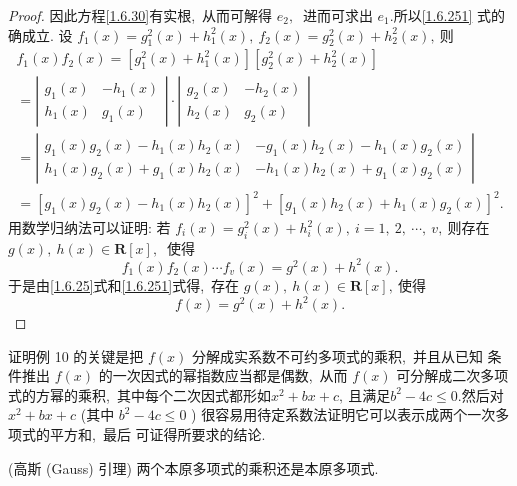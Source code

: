 \begin{proof}
	因此方程\eqref{1.6.30}有实根,\  从而可解得 $ e_{2} ,\ $ 进而可求出  $e_{1}  .$所以\eqref{1.6.251} 式的确成立.
	设 $ f_{1}(x)=g_{1}^{2}(x)+h_{1}^{2}(x),\  f_{2}(x)=g_{2}^{2}(x)+h_{2}^{2}(x) ,\  $则
	$$\begin{array}{l}
		f_{1}(x) f_{2}(x)=\left[g_{1}^{2}(x)+h_{1}^{2}(x)\right]\left[g_{2}^{2}(x)+h_{2}^{2}(x)\right] \\
		=\left|\begin{array}{cc}
			g_{1}(x) & -h_{1}(x) \\
			h_{1}(x) & g_{1}(x)
		\end{array}\right| \cdot\left|\begin{array}{cc}
			g_{2}(x) & -h_{2}(x) \\
			h_{2}(x) & g_{2}(x)
		\end{array}\right| \\
		=\left|\begin{array}{ll}
			g_{1}(x) g_{2}(x)-h_{1}(x) h_{2}(x) & -g_{1}(x) h_{2}(x)-h_{1}(x) g_{2}(x) \\
			h_{1}(x) g_{2}(x)+g_{1}(x) h_{2}(x) & -h_{1}(x) h_{2}(x)+g_{1}(x) g_{2}(x)
		\end{array}\right| \\
		=\left[g_{1}(x) g_{2}(x)-h_{1}(x) h_{2}(x)\right]^{2}+\left[g_{1}(x) h_{2}(x)+h_{1}(x) g_{2}(x)\right]^{2} .
	\end{array}$$
	用数学归纳法可以证明: 若  $f_{i}(x)=g_{i}^{2}(x)+h_{i}^{2}(x),\  i=1,\ 2,\  \cdots,\  v ,\  $则存在  $g(x),\  h(x) \in   \mathbf{R}[x] ,\ $ 使得
	$$f_{1}(x) f_{2}(x) \cdots f_{v}(x)=g^{2}(x)+h^{2}(x) .$$
	于是由\eqref{1.6.25}式和\eqref{1.6.251}式得,\  存在 $ g(x),\  h(x) \in \mathbf{R}[x] ,\  $使得
	$$f(x)=g^{2}(x)+h^{2}(x) .$$
\end{proof}
\begin{note}
	证明例 10 的关键是把 $ f(x) $ 分解成实系数不可约多项式的乘积,\  并且从已知 条件推出 $ f(x) $ 的一次因式的幂指数应当都是偶数,\  从而 $ f(x) $ 可分解成二次多项式的方幂的乘积,\  其中每个二次因式都形如$  x^{2}+b x+c ,\  $且满足$  b^{2}-4 c \leqslant 0  .$然后对$  x^{2}+b x+c $ (其中 $ b^{2}-4 c \leqslant 0 $ ) 很容易用待定系数法证明它可以表示成两个一次多项式的平方和,\  最后 可证得所要求的结论.
\end{note}
\newpage
\begin{lemma}
	(高斯 (Gauss) 引理) 两个本原多项式的乘积还是本原多项式.
\end{lemma}
